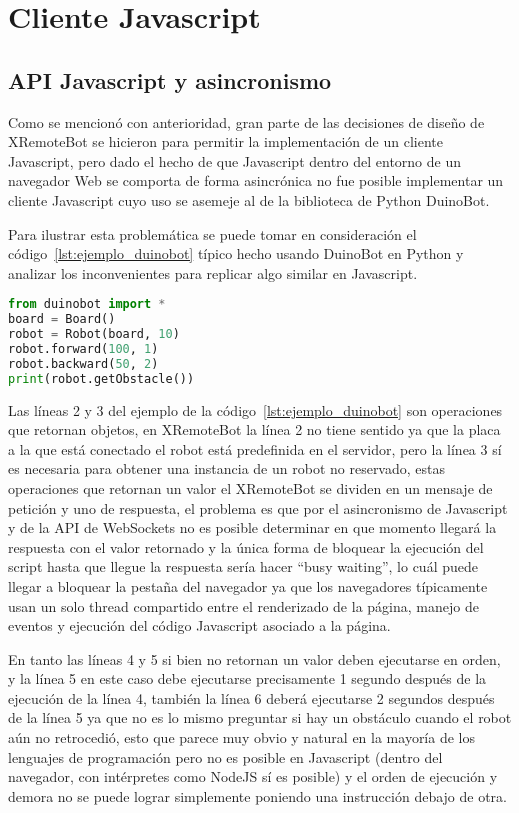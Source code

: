 \section{Cliente Javascript}\label{sec:javascript}

\subsection{API Javascript y asincronismo}
Como se mencionó con anterioridad, gran parte de las decisiones de diseño de XRemoteBot
se hicieron para permitir la implementación de un cliente Javascript, pero dado el hecho
de que Javascript dentro del entorno de un navegador Web se comporta de forma asincrónica
no fue posible implementar un cliente Javascript cuyo uso se asemeje al de la biblioteca
de Python DuinoBot.

Para ilustrar esta problemática se puede tomar en consideración el
código~\ref{lst:ejemplo_duinobot}
típico hecho usando DuinoBot en Python y analizar los inconvenientes para replicar
algo similar en Javascript.

\begin{lstlisting}[language=Python,
caption={Ejemplo típico usando DuinoBot},label=lst:ejemplo_duinobot]
from duinobot import *
board = Board()
robot = Robot(board, 10)
robot.forward(100, 1)
robot.backward(50, 2)
print(robot.getObstacle())
\end{lstlisting}


Las líneas 2 y 3 del ejemplo de la código~\ref{lst:ejemplo_duinobot} son
operaciones que retornan objetos, en XRemoteBot la línea 2 no tiene sentido
ya que la placa a la que está conectado el robot está predefinida en el
servidor, pero la línea 3 sí es necesaria para obtener una instancia de un
robot no reservado, estas operaciones que retornan un valor el XRemoteBot
se dividen en un mensaje de petición y uno de respuesta, el problema
es que por el asincronismo de Javascript y de la API de WebSockets no
es posible determinar en que momento llegará la respuesta con el valor
retornado y la única forma de bloquear la ejecución del script hasta que
llegue la respuesta sería hacer ``busy waiting'', lo cuál puede llegar a
bloquear la pestaña del navegador ya que los navegadores típicamente usan
un solo thread compartido entre el renderizado de la página, manejo de
eventos y ejecución del código Javascript asociado a la página.

En tanto las líneas 4 y 5 si bien no retornan un valor deben ejecutarse
en orden, y la línea 5 en este caso debe ejecutarse precisamente 1 segundo
después de la ejecución de la línea 4, también la línea 6 deberá ejecutarse
2 segundos después de la línea 5 ya que no es lo mismo preguntar si hay
un obstáculo cuando el robot aún no retrocedió, esto que parece muy obvio
y natural en la mayoría de los lenguajes de programación pero no es posible
en Javascript (dentro del navegador, con intérpretes como NodeJS sí es
posible) y el orden de ejecución y demora no se puede lograr simplemente
poniendo una instrucción debajo de otra.

